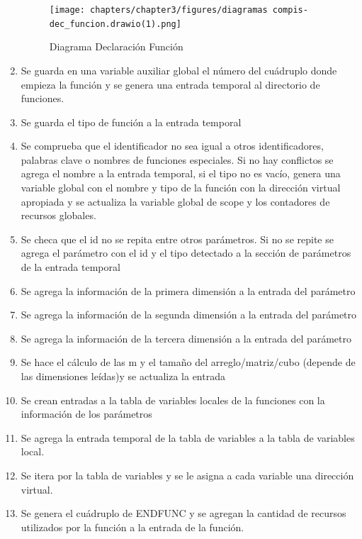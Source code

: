 \begin{enumerate}
    \newpage
    
    \begin{figure}[!htbp]
            \centering
            \texttt{[image: chapters/chapter3/figures/diagramas compis-dec\_funcion.drawio(1).png]}
            \caption{Diagrama Declaración Función}
            \label{fig:my_label}
    \end{figure}
    \FloatBarrier
    
    
    \item Se guarda en una variable auxiliar global el número del cuádruplo donde empieza la función y se genera una entrada temporal al directorio de funciones.
    \item Se guarda el tipo de función a la entrada temporal
    \item Se comprueba que el identificador no sea igual a otros identificadores, palabras clave o nombres de funciones especiales. Si no hay conflictos se agrega el nombre a la entrada temporal, si el tipo no es vacío, genera una variable global con el nombre y tipo de la función con la dirección virtual apropiada y se actualiza la variable global de scope y los contadores de recursos globales.
    \item Se checa que el id no se repita entre otros parámetros. Si no se repite se agrega el parámetro con el id y el tipo detectado a la sección de parámetros de la entrada temporal
    \item Se agrega la información de la primera dimensión a la entrada del parámetro
    \item Se agrega la información de la segunda dimensión a la entrada del parámetro
    \item Se agrega la información de la tercera dimensión a la entrada del parámetro
    \item Se hace el cálculo de las m y el tamaño del arreglo/matriz/cubo (depende de las dimensiones leídas)y se actualiza la entrada
    \item Se crean entradas a la tabla de variables locales de la funciones con la información de los parámetros
    \item Se agrega la entrada temporal de la tabla de variables a la tabla de variables local.
    \item Se itera por la tabla de variables y se le asigna a cada variable una dirección virtual.
    \item Se genera el cuádruplo de ENDFUNC y se agregan la cantidad de recursos utilizados por la función a la entrada de la función.
    

\end{enumerate}
